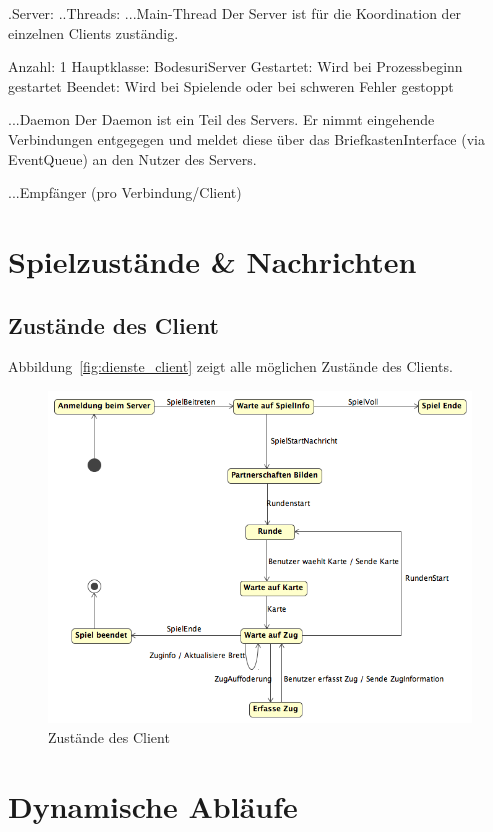 \documentclass[12pt,halfparskip]{scrartcl}
\begin{document}
.Server: 
..Threads:
...Main-Thread
Der Server ist für die Koordination der einzelnen Clients zuständig.

Anzahl: 1
Hauptklasse: BodesuriServer
Gestartet: Wird bei Prozessbeginn gestartet
Beendet: Wird bei Spielende oder bei schweren Fehler gestoppt

...Daemon
Der Daemon ist ein Teil des Servers. Er nimmt eingehende Verbindungen entgegegen und meldet diese über das BriefkastenInterface (via EventQueue) an den Nutzer des Servers.




...Empfänger (pro Verbindung/Client)




\clearpage
\section{Spielzustände \& Nachrichten} %
\label{spielzustaende_nachrichten}
\subsection{Zustände des Client} %
\label{sub:zustände_des_client}
Abbildung~\vref{fig:dienste_client} zeigt alle möglichen Zustände des Clients.
\begin{figure}[h]
	\centering
	\includegraphics[width=0.8 \textwidth]{dienste_client}
	\caption{Zustände des Client}
	\label{fig:dienste_client}
\end{figure}


\clearpage
\section{Dynamische Abläufe} %
\label{dynamische_ablauefe}
\end{document}
